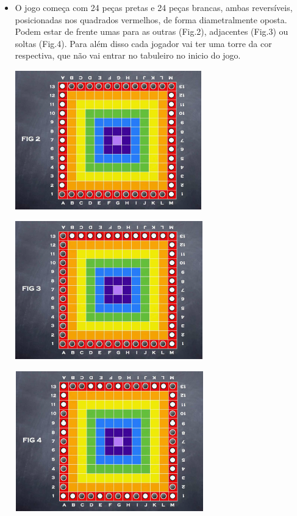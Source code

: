 \documentclass[a4paper]{article}
\begin{document}
\begin{itemize}
	\item O jogo começa com 24 peças pretas e 24 peças brancas, ambas reversíveis, posicionadas nos quadrados vermelhos, de forma diametralmente oposta. Podem estar de frente umas para as outras (Fig.2), adjacentes (Fig.3) ou soltas (Fig.4). Para além disso cada jogador vai ter uma torre da cor respectiva, que não vai entrar no tabuleiro no inicio do jogo. 
\begin{center}
\includegraphics[scale=0.9]{fig2.png}\linebreak\linebreak 
\end{center}

\begin{center}
\includegraphics[scale=0.9]{fig3.png}\linebreak\linebreak 
\end{center}

\begin{center}
\includegraphics[scale=0.9]{fig4.png}\linebreak\linebreak 
\end{center}


\end{itemize}
\end{document}
